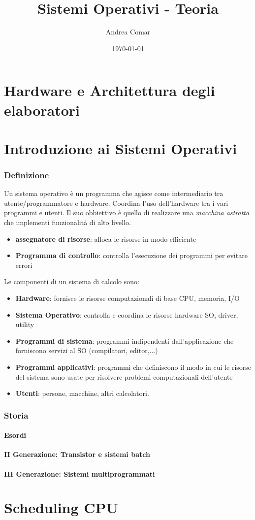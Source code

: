\documentclass{article}
\title{Sistemi Operativi - Teoria}
\author{Andrea Comar}
\date{\today}
\begin{document}
\maketitle
\newpage
\tableofcontents
\newpage

\part{Hardware e Architettura degli elaboratori}

\part{Introduzione ai Sistemi Operativi}
\section{Definizione}
Un sistema operativo è un programma che agisce come intermediario tra utente/programmatore e hardware. Coordina l'uso dell'hardware tra i vari programmi e utenti.
Il suo obbiettivo è quello di realizzare una \textit{macchina astratta} che implementi funzionalità di alto livello.
\begin{itemize}
    \item \textbf{assegnatore di risorse}: alloca le risorse in modo efficiente
    \item \textbf{Programma di controllo}: controlla l'esecuzione dei programmi per evitare errori
\end{itemize}

Le componenti di un sistema di calcolo sono:
\begin{itemize}
    \item \textbf{Hardware}: fornisce le risorse computazionali di base CPU, memoria, I/O
    \item \textbf{Sistema Operativo}: controlla e coordina le risorse hardware SO, driver, utility
    \item \textbf{Programmi di sistema}: programmi indipendenti dall'applicazione che forniscono servizi al SO (compilatori, editor,...)
    \item \textbf{Programmi applicativi}: programmi che definiscono il modo in cui le risorse del sistema sono usate per risolvere problemi computazionali dell'utente
    \item \textbf{Utenti}: persone, macchine, altri calcolatori.
\end{itemize}

\section{Storia}
\subsection{Esordi}

\subsection{II Generazione: Transistor  e sistemi batch} 
\subsection{III Generazione: Sistemi multiprogrammati}

\part{Scheduling CPU}
\end{document}
